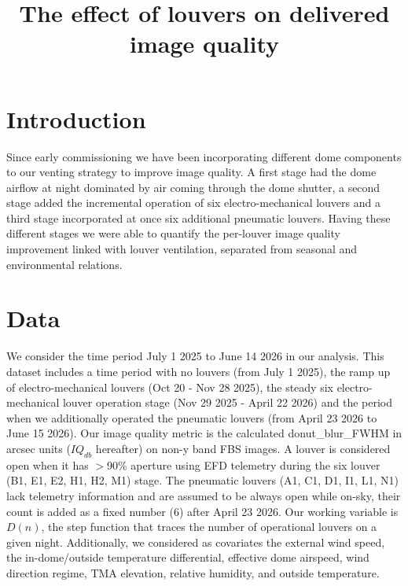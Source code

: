 \documentclass[TS,lsstdraft,authoryear,toc]{lsstdoc}
\title{The effect of louvers on delivered image quality}
\date{\vcsDate}
\begin{document}
\maketitle
\section{Introduction}
Since early commissioning we have been incorporating different dome components to our venting strategy to improve image quality. A first stage had the dome airflow at night dominated by air coming through the dome shutter, a second stage added the incremental operation of six electro-mechanical louvers and a third stage incorporated at once six additional pneumatic louvers.  Having these different stages we were able to quantify the per-louver image quality improvement linked with louver ventilation, separated from seasonal and environmental relations.

\section{Data}
We consider the time period July 1 2025 to June 14 2026 in our analysis. This dataset includes a time period with no louvers (from July 1 2025), the ramp up of electro-mechanical louvers (Oct 20 - Nov 28 2025), the steady six electro-mechanical louver operation stage (Nov 29 2025 - April 22 2026) and the period when we additionally operated the pneumatic louvers (from April 23 2026 to June 15 2026). Our image quality metric is the calculated donut\_blur\_FWHM in arcsec units ($IQ_{db}$ hereafter) on non-y band FBS images. A louver is considered open when it has $>$90\% aperture using EFD telemetry during the six louver (B1, E1, E2, H1, H2, M1) stage. The pneumatic louvers (A1, C1, D1, I1, L1, N1) lack telemetry information and are assumed to be always open while on-sky, their count is added as a fixed number (6) after April 23 2026. Our working variable is $D(n)$, the step function that traces the number of operational louvers on a given night. Additionally, we considered as covariates the external wind speed, the in-dome/outside temperature differential, effective dome airspeed, wind direction regime, TMA elevation, relative humidity, and outside temperature.                                          
\end{document}

